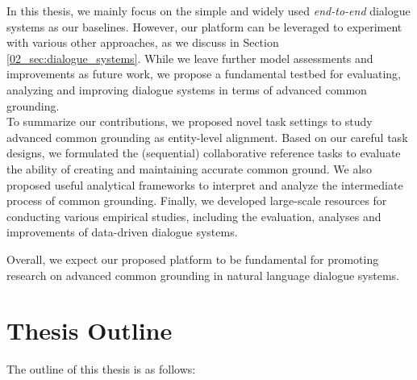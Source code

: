 In this thesis, we mainly focus on the simple and widely used \textit{end-to-end} dialogue systems \citep{vinyals2015neural,bordes2017learning,lewis-etal-2017-deal} as our baselines. However, our platform can be leveraged to experiment with various other approaches, as we discuss in Section \ref{02_sec:dialogue_systems}. While we leave further model assessments and improvements as future work, we propose a fundamental testbed for evaluating, analyzing and improving dialogue systems in terms of advanced common grounding.
\\

To summarize our contributions, we proposed novel task settings to study advanced common grounding as entity-level alignment. Based on our careful task designs, we formulated the (sequential) collaborative reference tasks to evaluate the ability of creating and maintaining accurate common ground. We also proposed useful analytical frameworks to interpret and analyze the intermediate process of common grounding. Finally, we developed large-scale resources for conducting various empirical studies, including the evaluation, analyses and improvements of data-driven dialogue systems.

Overall, we expect our proposed platform to be fundamental for promoting research on advanced common grounding in natural language dialogue systems.


\section{Thesis Outline}
\label{01_sec:thesis_outline}

The outline of this thesis is as follows:

